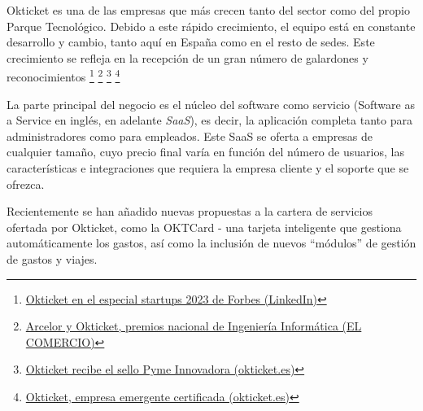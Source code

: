 Okticket es una de las empresas que más crecen tanto del sector como del propio Parque
Tecnológico. Debido a este rápido crecimiento, el equipo está en constante desarrollo y
cambio, tanto aquí en España como en el resto de sedes. Este crecimiento se refleja
en la recepción de un gran número de galardones y reconocimientos
\footnote{\href{https://www.linkedin.com/posts/okticket_okticket-en-el-especial-startups-de-forbes-activity-7140622980618903552-UGWK}{Okticket en el especial startups 2023 de Forbes (LinkedIn)}}
\footnote{\href{https://www.elcomercio.es/economia/arcelor-okticket-premios-20230222002438-ntvo.html}{Arcelor y Okticket, premios nacional de Ingeniería Informática (EL COMERCIO)}}
\footnote{\href{https://www.okticket.es/blog/empresa-pyme-innovadora}{Okticket recibe el sello Pyme Innovadora (okticket.es)}}
\footnote{\href{https://www.okticket.es/blog/okticket-empresa-emergente-certificada}{Okticket, empresa emergente certificada (okticket.es)}}

La parte principal del negocio es el núcleo del software como servicio (Software as a
Service en inglés, en adelante \textit{SaaS}), es decir, la aplicación completa tanto
para administradores como para empleados. Este SaaS se oferta a empresas de cualquier
tamaño, cuyo precio final varía en función del número de usuarios, las características
e integraciones que requiera la empresa cliente y el soporte que se ofrezca.

Recientemente se han añadido nuevas propuestas a la cartera de servicios ofertada por
Okticket, como la OKTCard {-} una tarjeta inteligente que gestiona automáticamente los gastos,
así como la inclusión de nuevos ``módulos'' de gestión de gastos y viajes.
